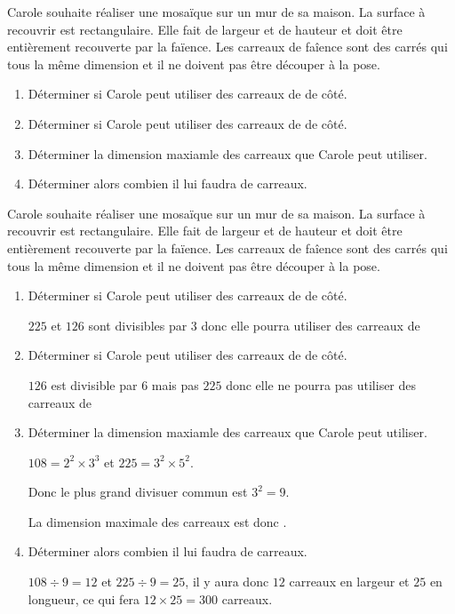 \begin{exercice*}[Mosaïque]
    Carole souhaite réaliser une mosaïque sur un mur de sa maison. La surface à recouvrir est rectangulaire.
    Elle fait  de largeur et  de hauteur et doit être entièrement recouverte par la faïence.
    Les carreaux de faîence sont des carrés qui tous la même dimension et il ne doivent pas être découper à la pose.    
    \begin{enumerate}
        \item Déterminer si Carole peut utiliser des carreaux de  de côté.
        \item Déterminer si Carole peut utiliser des carreaux de  de côté.
        \item Déterminer la dimension maxiamle des carreaux que Carole peut utiliser.
        \item Déterminer alors combien il lui faudra de carreaux.
    \end{enumerate}
\end{exercice*}
\begin{corrige}
    Carole souhaite réaliser une mosaïque sur un mur de sa maison. La surface à recouvrir est rectangulaire.
    Elle fait  de largeur et  de hauteur et doit être entièrement recouverte par la faïence.
    Les carreaux de faîence sont des carrés qui tous la même dimension et il ne doivent pas être découper à la pose.

    \begin{enumerate}
        \item Déterminer si Carole peut utiliser des carreaux de  de côté.
        
        {\color{red} $225$ et $126$ sont divisibles par $3$ donc elle pourra utiliser des carreaux de }
        \item Déterminer si Carole peut utiliser des carreaux de  de côté.
        
        {\color{red} $126$ est divisible par $6$ mais pas $225$ donc elle ne pourra pas utiliser des carreaux de }
        \item Déterminer la dimension maxiamle des carreaux que Carole peut utiliser.
        
        {\color{red} $108 = 2^2\times 3^3$ et $225=3^2\times 5^2$.

        Donc le plus grand divisuer commun est $3^2=9$. 

        La dimension maximale des carreaux est donc .
        }
        \item Déterminer alors combien il lui faudra de carreaux.
        
        {\color{red} $108\div 9 = 12$ et $225\div 9 = 25$, il y aura donc $12$ carreaux en largeur et $25$ en longueur, ce qui fera $12\times 25 = 300$ carreaux.}
    \end{enumerate}
\end{corrige}

